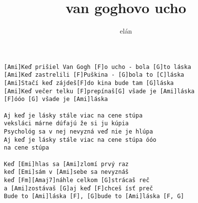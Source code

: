 \author{elán}
\title{van goghovo ucho}
\maketitle
\begin{verbatim}
[Ami]Keď prišiel Van Gogh [F]o ucho - bola [G]to láska
[Ami]Keď zastrelili [F]Puškina - [G]bola to [C]láska
[Ami]Stačí keď zájdeš[F]do kina bude tam [G]láska
[Ami]Keď večer telku [F]prepínaš[G] všade je [Ami]láska
[F]óóo [G] všade je [Ami]láska

Aj keď je lásky stále viac na cene stúpa
veksláci márne dúfajú že si ju kúpia
Psychológ sa v nej nevyzná veď nie je hlúpa
Aj keď je lásky stále viac na cene stúpa óóo
na cene stúpa

Keď [Emi]hlas sa [Ami]zlomí prvý raz
keď [Emi]sám v [Ami]sebe sa nevyznáš
keď [Fm][Amaj7]náhle celkom [G]strácaš reč
a [Ami]zostávaš [G]aj keď [F]chceš ísť preč
Bude to [Ami]láska [F], [G]bude to [Ami]láska [F, G]
\end{verbatim}
